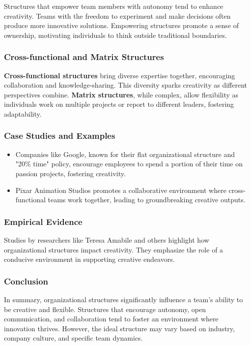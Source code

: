 \documentclass[a4paper, twoside]{article}
\begin{document}
Structures that empower team members with autonomy tend to enhance creativity. Teams with the freedom to experiment and make decisions often produce more innovative solutions. Empowering structures promote a sense of ownership, motivating individuals to think outside traditional boundaries.

\subsubsection{Cross-functional and Matrix Structures}

\textbf{Cross-functional structures} bring diverse expertise together, encouraging collaboration and knowledge-sharing. This diversity sparks creativity as different perspectives combine.\newline
\newline
\textbf{Matrix structures}, while complex, allow flexibility as individuals work on multiple projects or report to different leaders, fostering adaptability.

\subsubsection{Case Studies and Examples}
\begin{itemize}
    \item   Companies like Google, known for their flat organizational structure and "20\% time" policy, encourage employees to spend a portion of their time on passion projects, fostering creativity.
    \item   Pixar Animation Studios promotes a collaborative environment where cross-functional teams work together, leading to groundbreaking creative outputs.
\end{itemize}


\subsubsection{Empirical Evidence}

Studies by researchers like Teresa Amabile and others highlight how organizational structures impact creativity. They emphasize the role of a conducive environment in supporting creative endeavors.


\subsubsection{Conclusion}
In summary, organizational structures significantly influence a team's ability to be creative and flexible. Structures that encourage autonomy, open communication, and collaboration tend to foster an environment where innovation thrives. However, the ideal structure may vary based on industry, company culture, and specific team dynamics.
\end{document}

